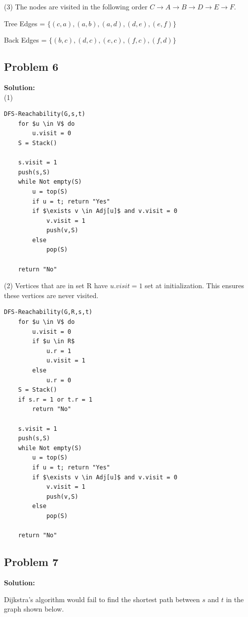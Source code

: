 \documentclass[12pt,a4paper]{article}
\newcommand{\solution}{\noindent\textbf{Solution:}\\\indent}
\begin{document}
(3) The nodes are visited in the following order $C \rightarrow A \rightarrow B \rightarrow D \rightarrow E \rightarrow F$.

Tree Edges = $\{(c,a), (a,b), (a,d), (d,e), (e,f) \}$

Back Edges = $\{(b,c), (d,c), (e,c), (f,c), (f,d) \}$

\newpage
\subsection*{Problem 6}
\solution
(1)

\begin{lstlisting}[mathescape=true]
DFS-Reachability(G,s,t)
    for $u \in V$ do
        u.visit = 0
    S = Stack()
    
    s.visit = 1
    push(s,S)
    while Not empty(S)
        u = top(S)
        if u = t; return "Yes"
        if $\exists v \in Adj[u]$ and v.visit = 0
            v.visit = 1
            push(v,S)
        else
            pop(S)
    
    return "No"
\end{lstlisting}

(2) Vertices that are in set R have $u.visit = 1$ set at initialization. This ensures these vertices are never visited.


\begin{lstlisting}[mathescape=true]
DFS-Reachability(G,R,s,t)
    for $u \in V$ do
        u.visit = 0
        if $u \in R$
            u.r = 1
            u.visit = 1
        else
            u.r = 0
    S = Stack()
    if s.r = 1 or t.r = 1
        return "No"
        
    s.visit = 1
    push(s,S)
    while Not empty(S)
        u = top(S)
        if u = t; return "Yes"
        if $\exists v \in Adj[u]$ and v.visit = 0
            v.visit = 1
            push(v,S)
        else
            pop(S)
    
    return "No"
\end{lstlisting}

\newpage
\subsection*{Problem 7}
\solution

Dijkstra's algorithm would fail to find the shortest path between $s$ and $t$ in the graph shown below.
\end{document}
